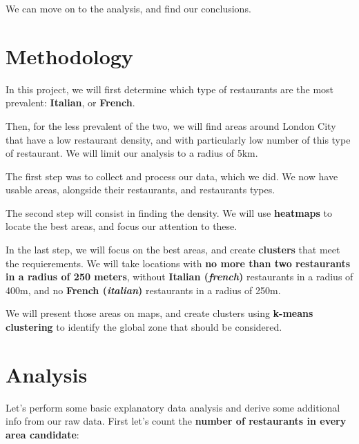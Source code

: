 \documentclass[11pt]{article}
\begin{document}
We can move on to the analysis, and find our conclusions.


    \hypertarget{methodology}{%
\section{\texorpdfstring{Methodology
}{Methodology }}\label{methodology}}

In this project, we will first determine which type of restaurants are
the most prevalent: \textbf{Italian}, or \textbf{French}.

Then, for the less prevalent of the two, we will find areas around
London City that have a low restaurant density, and with particularly
low number of this type of restaurant. We will limit our analysis to a
radius of 5km.

The first step was to collect and process our data, which we did. We now
have usable areas, alongside their restaurants, and restaurants types.

The second step will consist in finding the density. We will use
\textbf{heatmaps} to locate the best areas, and focus our attention to
these.

In the last step, we will focus on the best areas, and create
\textbf{clusters} that meet the requierements. We will take locations
with \textbf{no more than two restaurants in a radius of 250 meters},
without \textbf{Italian (\emph{french})} restaurants in a radius of
400m, and no \textbf{French (\emph{italian})} restaurants in a radius of
250m.

We will present those areas on maps, and create clusters using
\textbf{k-means clustering} to identify the global zone that should be
considered.


    \hypertarget{analysis}{%
\section{\texorpdfstring{Analysis }{Analysis }}\label{analysis}}

Let's perform some basic explanatory data analysis and derive some
additional info from our raw data. First let's count the \textbf{number
of restaurants in every area candidate}:
\end{document}
